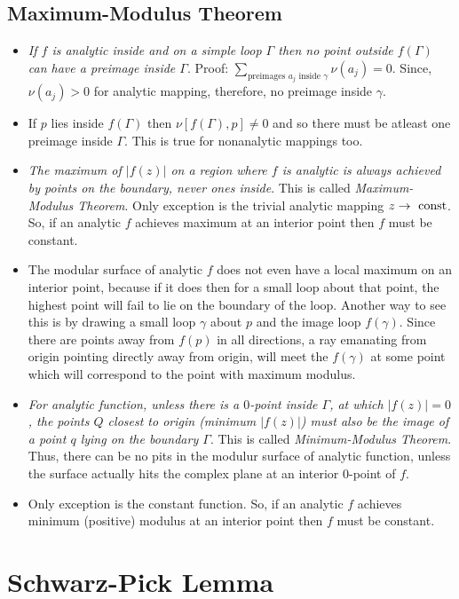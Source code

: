 \documentclass[12pt]{article}
\def\tt{\textit}
\def\rto{\ensuremath\rightarrow\ }
\begin{document}
\subsection{Maximum-Modulus Theorem}
\begin{itemize}
    \item \tt{If $f$ is analytic inside and on a simple loop $\Gamma$ then no point outside $f(\Gamma)$ can have a preimage inside $\Gamma$}. Proof: $\sum_{\text{preimages } a_{j} \text{ inside } \gamma}\nu(a_j) = 0$. Since, $\nu(a_j)>0$ for analytic mapping, therefore, no preimage inside $\gamma$.
    \item If $p$ lies inside $f(\Gamma)$ then $\nu[f(\Gamma),p]\neq 0$ and so there must be atleast one preimage inside $\Gamma$. This is true for nonanalytic mappings too.
    \item \tt{The maximum of $|f(z)|$ on a region where $f$ is analytic is always achieved by points on the boundary, never ones inside}. This is called \tt{Maximum-Modulus Theorem}. Only exception is the trivial analytic mapping $z\rto \text{const}$. So, if an analytic $f$ achieves maximum at an interior point then $f$ must be constant.
    \item The modular surface of analytic $f$ does not even have a local maximum on an interior point, because if it does then for a small loop about that point, the highest point will fail to lie on the boundary of the loop. Another way to see this is by drawing a small loop $\gamma$ about $p$ and the image loop $f(\gamma)$. Since there are points away from $f(p)$ in all directions, a ray emanating from origin pointing directly away from origin, will meet the $f(\gamma)$ at some point which will correspond to the point with maximum modulus.
    \item \tt{For analytic function, unless there is a $0$-point inside $\Gamma$, at which $|f(z)|=0$, the points $Q$ closest to origin (minimum $|f(z)|$) must also be the image of a point $q$ lying on the boundary $\Gamma$}. This is called \tt{Minimum-Modulus Theorem}. Thus, there can be no pits in the modulur surface of analytic function, unless the surface actually hits the complex plane at an interior $0$-point of $f$.
    \item Only exception is the constant function. So, if an analytic $f$ achieves minimum (positive) modulus at an interior point then $f$ must be constant.
\end{itemize}
\section{Schwarz-Pick Lemma}
\end{document}
